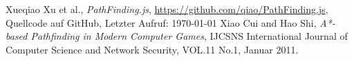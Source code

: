 \begin{thebibliography}{9}
  Xueqiao Xu et al.,
  \textit{PathFinding.js},
  \url{https://github.com/qiao/PathFinding.js},
  Quellcode auf GitHub,
  Letzter Aufruf: \today
{}
  Xiao Cui and Hao Shi,
  \textit{A*-based Pathfinding in Modern Computer Games},
  IJCSNS International Journal of Computer Science and Network Security, VOL.11 No.1,
  Januar 2011.
\end{thebibliography}
